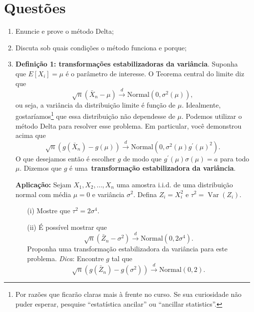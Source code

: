\documentclass[a4paper,10pt, notitlepage]{report}
\begin{document}
\section*{Questões}
\begin{enumerate}
 \item Enuncie e prove o método Delta;
 \item Discuta sob quais condições o método funciona e porque;
 \item \textbf{Definição 1: transformações estabilizadoras da variância}.
 Suponha que $E[X_i] = \mu$ é o parâmetro de interesse. 
 O Teorema central do limite diz que
 \begin{equation}
  \sqrt{n}\left(\bar{X}_n - \mu \right) \xrightarrow{d} \textrm{Normal}\left(0, \sigma^2(\mu)\right),
 \end{equation}
ou seja, a variância da distribuição limite é função de $\mu$.
Idealmente, gostaríamos\footnote{Por razões que ficarão claras mais à frente no curso.
Se sua curiosidade não puder esperar, pesquise ``estatística ancilar'' ou ``ancillar statistics''.} que essa distribuição não dependesse de $\mu$.
Podemos utilizar o método Delta para resolver esse problema.
Em particular, você demonstrou acima que
\begin{equation}
 \sqrt{n}\left(g(\bar{X}_n) - g(\mu) \right) \xrightarrow{d} \textrm{Normal}\left(0, \sigma^2(\mu)g^\prime(\mu)^2\right).
\end{equation}
O que desejamos então é escolher $g$ de modo que $g^\prime(\mu)\sigma(\mu) = a$ para todo $\mu$.
Dizemos que $g$ é uma~\textbf{transformação estabilizadora da variância}.

\textbf{Aplicação:} Sejam $X_1, X_2, \ldots, X_n$ uma amostra i.i.d. de uma distribuição normal com média $\mu = 0$ e variância $\sigma^2$.
Defina $Z_i = X_i^2$ e $\tau^2 = \operatorname{Var}(Z_i)$.
\begin{itemize}
 \item[(i)] Mostre que $\tau^2 = 2\sigma^4$.
 \item[(ii)] É possível mostrar que 
 \begin{equation}
 \sqrt{n}\left(\bar{Z}_n - \sigma^2 \right) \xrightarrow{d} \textrm{Normal}\left(0, 2\sigma^4\right).
\end{equation}
Proponha uma transformação estabilizadora da variância para este problema.
\textit{Dica}: Encontre $g$ tal que 
 \begin{equation*}
 \sqrt{n}\left(g(\bar{Z}_n) - g(\sigma^2) \right) \xrightarrow{d} \textrm{Normal}\left(0, 2\right).
\end{equation*}
\end{itemize}
\end{enumerate}



\end{document}
